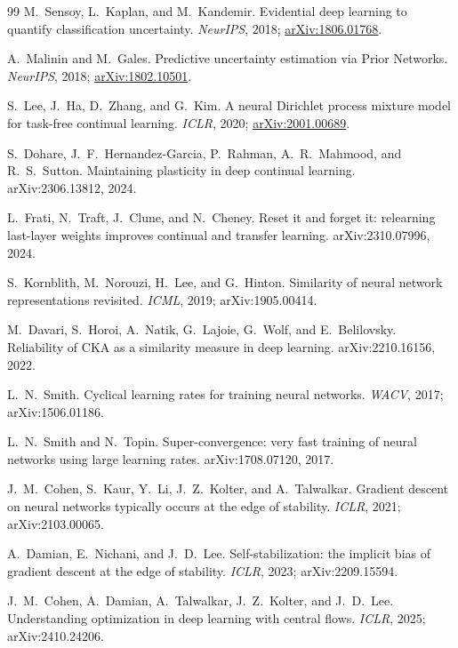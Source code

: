 \documentclass[11pt]{article}
\begin{document}
\begin{thebibliography}{99}
M.~Sensoy, L.~Kaplan, and M.~Kandemir.
Evidential deep learning to quantify classification uncertainty.
\emph{NeurIPS}, 2018;
\href{https://arxiv.org/abs/1806.01768}{arXiv:1806.01768}.

A.~Malinin and M.~Gales.
Predictive uncertainty estimation via Prior Networks.
\emph{NeurIPS}, 2018;
\href{https://arxiv.org/abs/1802.10501}{arXiv:1802.10501}.

S.~Lee, J.~Ha, D.~Zhang, and G.~Kim.
A neural Dirichlet process mixture model for task-free continual learning.
\emph{ICLR}, 2020;
\href{https://arxiv.org/abs/2001.00689}{arXiv:2001.00689}.

 S.~Dohare, J.~F.~Hernandez-Garcia,
P.~Rahman, A.~R.~Mahmood, and R.~S.~Sutton.
Maintaining plasticity in deep continual learning.
arXiv:2306.13812, 2024.

 L.~Frati, N.~Traft, J.~Clune, and N.~Cheney.
Reset it and forget it: relearning last-layer weights improves continual and
transfer learning.
arXiv:2310.07996, 2024.

 S.~Kornblith, M.~Norouzi, H.~Lee, and G.~Hinton.
Similarity of neural network representations revisited.
\emph{ICML}, 2019; arXiv:1905.00414.

 M.~Davari, S.~Horoi, A.~Natik, G.~Lajoie, G.~Wolf,
and E.~Belilovsky.
Reliability of CKA as a similarity measure in deep learning.
arXiv:2210.16156, 2022.

 L.~N.~Smith.
Cyclical learning rates for training neural networks.
\emph{WACV}, 2017; arXiv:1506.01186.

 L.~N.~Smith and N.~Topin.
Super-convergence: very fast training of neural networks using large learning
rates.
arXiv:1708.07120, 2017.

 J.~M.~Cohen, S.~Kaur, Y.~Li, J.~Z.~Kolter, and
A.~Talwalkar.
Gradient descent on neural networks typically occurs at the edge of stability.
\emph{ICLR}, 2021; arXiv:2103.00065.

 A.~Damian, E.~Nichani, and J.~D.~Lee.
Self-stabilization: the implicit bias of gradient descent at the edge of
stability.
\emph{ICLR}, 2023; arXiv:2209.15594.

 J.~M.~Cohen, A.~Damian, A.~Talwalkar,
J.~Z.~Kolter, and J.~D.~Lee.
Understanding optimization in deep learning with central flows.
\emph{ICLR}, 2025; arXiv:2410.24206.


\end{thebibliography}
\end{document}
